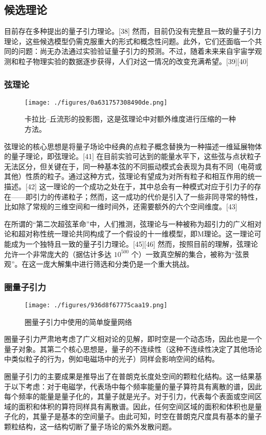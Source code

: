 \subsection{候选理论} 
目前存在多种提出的量子引力理论。[38] 然而，目前仍没有完整且一致的量子引力理论，这些候选模型仍需克服重大的形式和概念性问题。此外，它们还面临一个共同的问题：尚无办法通过实验验证量子引力的预测。不过，随着未来来自宇宙学观测和粒子物理实验的数据逐步获得，人们对这一情况的改变充满希望。[39][40]
\subsubsection{弦理论}
\begin{figure}[ht]
\centering
\texttt{[image: ./figures/0a631757308490de.png]}
\caption{卡拉比–丘流形的投影图，这是弦理论中对额外维度进行压缩的一种方法。} \label{fig_LZYL_5}
\end{figure}
弦理论的核心思想是将量子场论中经典的点粒子概念替换为一种描述一维延展物体的量子理论，即弦理论。[41] 在目前实验可达到的能量水平下，这些弦与点状粒子无法区分，但关键在于，同一种基本弦的不同振动模式会表现为具有不同（电荷或其他）性质的粒子。通过这种方式，弦理论有望成为对所有粒子和相互作用的统一描述。[42] 这一理论的一个成功之处在于，其中总会有一种模式对应于引力子的存在——即引力的传递粒子；然而，这一成功的代价是引入了一些非同寻常的特性，比如除了常规的三维空间和一维时间外，还需要额外的六个空间维度。[43]  

在所谓的“第二次超弦革命”中，人们推测，弦理论与一种被称为超引力的广义相对论和超对称性统一理论共同构成了一个假设的十一维模型，即M理论。这一理论可能成为一个独特且一致的量子引力理论。[45][46] 然而，按照目前的理解，弦理论允许一个非常庞大的（据估计多达 \(10^{500}\) 个）一致真空解的集合，被称为“弦景观”。在这一庞大解集中进行筛选和分类仍是一个重大挑战。
\subsubsection{圈量子引力}
\begin{figure}[ht]
\centering
\texttt{[image: ./figures/936d8f67775caa19.png]}
\caption{圈量子引力中使用的简单旋量网络} \label{fig_LZYL_6}
\end{figure}
圈量子引力严肃地考虑了广义相对论的见解，即时空是一个动态场，因此也是一个量子对象。其第二个核心思想是，量子的不连续性（这种不连续性决定了其他场论中类似粒子的行为，例如电磁场中的光子）同样会影响空间的结构。

圈量子引力的主要成果是推导出了在普朗克长度处空间的颗粒化结构。这一结果基于以下考虑：对于电磁学，代表场中每个频率能量的量子算符具有离散的谱，因此每个频率的能量是量子化的，其量子就是光子。对于引力，代表每个表面或空间区域的面积和体积的算符同样具有离散谱。因此，任何空间区域的面积和体积也是量子化的，其量子是基本的空间量子。由此可知，时空在普朗克尺度具有基本的量子颗粒结构，这一结构切断了量子场论的紫外发散问题。

